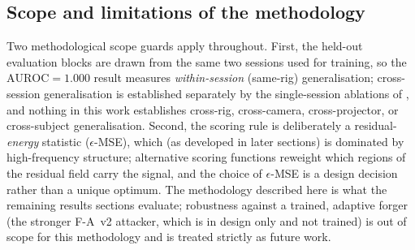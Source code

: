 \subsection{Scope and limitations of the methodology}

Two methodological scope guards apply throughout. First, the held-out evaluation blocks are drawn from the same two sessions used for training, so the $\mathrm{AUROC}=1.000$ result measures \emph{within-session} (same-rig) generalisation; cross-session generalisation is established separately by the single-session ablations of , and nothing in this work establishes cross-rig, cross-camera, cross-projector, or cross-subject generalisation. Second, the scoring rule is deliberately a residual-\emph{energy} statistic ($\epsilon$-MSE), which (as developed in later sections) is dominated by high-frequency structure; alternative scoring functions reweight which regions of the residual field carry the signal, and the choice of $\epsilon$-MSE is a design decision rather than a unique optimum. The methodology described here is what the remaining results sections evaluate; robustness against a trained, adaptive forger (the stronger F-A~v2 attacker, which is in design only and not trained) is out of scope for this methodology and is treated strictly as future work.
